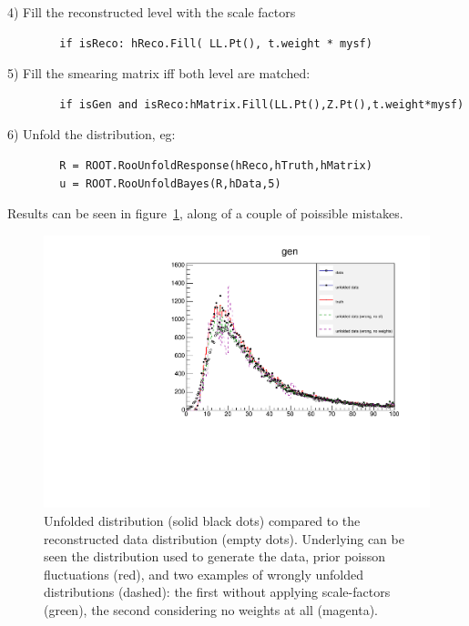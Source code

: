\documentclass[a4paper,11pt]{article}
\begin{document}
4) Fill the reconstructed level with the scale factors
\begin{verbatim}
        if isReco: hReco.Fill( LL.Pt(), t.weight * mysf)
\end{verbatim}

5) Fill the smearing matrix iff both level are matched:
\begin{verbatim}
        if isGen and isReco:hMatrix.Fill(LL.Pt(),Z.Pt(),t.weight*mysf)
\end{verbatim}


6) Unfold the distribution, eg:
\begin{verbatim}
        R = ROOT.RooUnfoldResponse(hReco,hTruth,hMatrix)
        u = ROOT.RooUnfoldBayes(R,hData,5)
\end{verbatim}

Results can be seen in figure~\ref{fig:sol:exe2}, along of a couple of poissible mistakes.

\begin{figure}[H]
	\centering 
	\includegraphics[width=.95\textwidth]{figs2/unfolding2.pdf}
	\caption{ \label{fig:sol:exe2} Unfolded distribution (solid black dots) compared to the reconstructed data distribution (empty dots). Underlying can be seen the distribution used to generate the data, prior poisson fluctuations (red), and two examples of wrongly unfolded distributions (dashed): the first without applying scale-factors (green), the second considering no weights at all (magenta).
	}
\end{figure}
\end{document}

